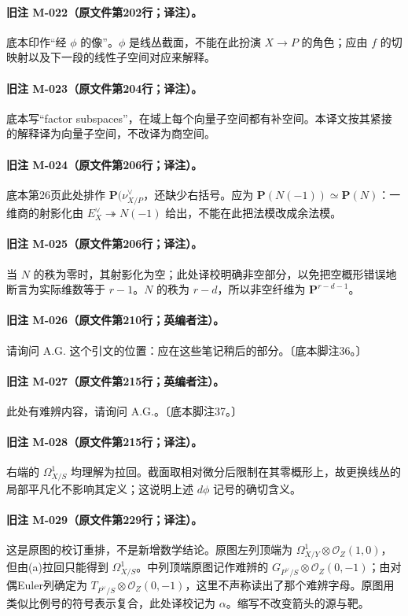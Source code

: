 \paragraph{旧注 M-022（原文件第202行；译注）。}
底本印作“经 $\phi$ 的像”。$\phi$ 是线丛截面，不能在此扮演 $X\to P$ 的角色；应由 $f$ 的切映射以及下一段的线性子空间对应来解释。

\paragraph{旧注 M-023（原文件第204行；译注）。}
底本写“factor subspaces”，在域上每个向量子空间都有补空间。本译文按其紧接的解释译为向量子空间，不改译为商空间。

\paragraph{旧注 M-024（原文件第206行；译注）。}
底本第26页此处排作 $\mathbf P(\nu_{X/P}^{\vee}$，还缺少右括号。应为 $\mathbf P(N(-1))\simeq\mathbf P(N)$：一维商的射影化由 $E_X^\vee\twoheadrightarrow N(-1)$ 给出，不能在此把法模改成余法模。

\paragraph{旧注 M-025（原文件第206行；译注）。}
当 $N$ 的秩为零时，其射影化为空；此处译校明确非空部分，以免把空概形错误地断言为实际维数等于 $r-1$。$N$ 的秩为 $r-d$，所以非空纤维为 $\mathbf P^{r-d-1}$。

\paragraph{旧注 M-026（原文件第210行；英编者注）。}
请询问 A.G. 这个引文的位置：应在这些笔记稍后的部分。〔底本脚注36。〕

\paragraph{旧注 M-027（原文件第215行；英编者注）。}
此处有难辨内容，请询问 A.G.。〔底本脚注37。〕

\paragraph{旧注 M-028（原文件第215行；译注）。}
右端的 $\Omega^1_{X/S}$ 均理解为拉回。截面取相对微分后限制在其零概形上，故更换线丛的局部平凡化不影响其定义；这说明上述 $d\phi$ 记号的确切含义。

\paragraph{旧注 M-029（原文件第229行；译注）。}
这是原图的校订重排，不是新增数学结论。原图左列顶端为 $\Omega^1_{X/Y}\otimes\mathcal O_Z(1,0)$，但由(a)拉回只能得到 $\Omega^1_{X/S}$。中列顶端原图记作难辨的 $G_{P^\vee/S}\otimes\mathcal O_Z(0,-1)$；由对偶Euler列确定为 $T_{P^\vee/S}\otimes\mathcal O_Z(0,-1)$，这里不声称读出了那个难辨字母。原图用类似比例号的符号表示复合，此处译校记为 $\alpha$。缩写不改变箭头的源与靶。


